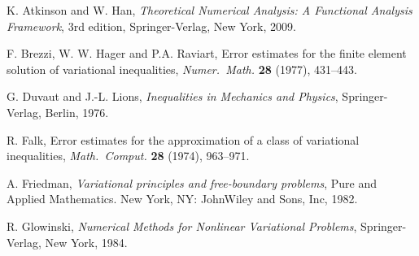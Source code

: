 \documentclass[12pt]{article}
\begin{document}
\begin{thebibliography}{10}

 K. Atkinson and W. Han, \emph{Theoretical Numerical
Analysis: A Functional Analysis Framework}, 3rd edition,
Springer-Verlag, New York, 2009.

%


F. Brezzi, W. W. Hager and P.A. Raviart, Error estimates for the finite element solution of
variational inequalities, \emph{Numer.\ Math.} {\bf 28} (1977), 431--443.

G. Duvaut and J.-L. Lions, \emph{Inequalities in Mechanics and
Physics}, Springer-Verlag, Berlin, 1976.

R. Falk, Error estimates for the approximation of a class of variational inequalities, 
\emph{Math.\ Comput.} {\bf 28} (1974), 963--971.

A. Friedman, \emph{Variational principles and free-boundary problems}, Pure and Applied
Mathematics. New York, NY: JohnWiley and Sons, Inc, 1982.

 R. Glowinski, \emph{Numerical Methods for Nonlinear
Variational Problems}, Springer-Verlag, New York, 1984.







\end{thebibliography}
\end{document}
